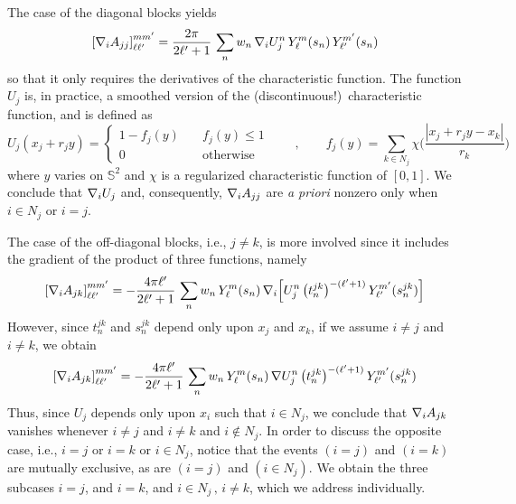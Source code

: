 The case of the diagonal blocks yields
\[
{[\nabla_i A_{jj}]}_{\ell \ell'}^{mm'} = \frac{2\pi}{2 \ell' + 1} \,\sum_{n} w_n \, \nabla_i U_j^n  \,Y_\ell^m(s_n) \,  Y_{\ell'}^{m'}(s_n)
\]
so that it only requires the derivatives of the characteristic function. The function $U_j$ is, in practice, a smoothed version of the (discontinuous!)~characteristic function, and is defined as 
\[
U_j(x_j + r_j y) =
\begin{cases}
1 - f_j(y) 	&\quad f_j(y) \le 1\\
0		&\quad \text{otherwise}
\end{cases}
\qquad , \qquad 
f_j(y) = \sum_{k \in N_j} \chi \bigg(\frac{|x_j + r_j y - x_k|}{r_k}\bigg)
\]
where $y$ varies on $\mathbb{S}^2$ and $\chi$ is a regularized characteristic function of $[0,1]$. We conclude that $\nabla_i U_j$ and, consequently, $\nabla_i A_{jj}$ are \emph{a priori} nonzero only when $i \in N_j$ or $i = j$.

The case of the off-diagonal blocks, i.e., $j \not=k$, is more involved since it includes the gradient of the product of three functions, namely
\begin{equation}\label{eq:7}
{[\nabla_iA_{jk}]}_{\ell \ell'}^{mm'} = -  \frac{4 \pi \ell'}{2 \ell'+1} \, \sum_{n} w_n\, Y_\ell^m(s_n) \,\nabla_i \Big[ U_j^n  \,  \big( t_n^{jk}\big)^{-(\ell'+1)} \, Y_{\ell'}^{m'} (s_n^{jk}) \Big]
\end{equation}
However, since $t_n^{jk}$ and $s_n^{jk}$ depend only upon $x_j$ and $x_k$, if we assume $i \not=j$ and $i\not=k$, we obtain
\begin{equation}\label{eq:8}
{[\nabla_iA_{jk}]}_{\ell \ell'}^{mm'} = -  \frac{4 \pi \ell'}{2 \ell'+1} \, \sum_{n} w_n\, Y_\ell^m(s_n) \,\nabla U_j^n  \,  \big( t_n^{jk}\big)^{-(\ell'+1)} \, Y_{\ell'}^{m'} (s_n^{jk})
\end{equation}
Thus, since $U_j$ depends only upon $x_i$ such that $i \in N_j$, we conclude that $\nabla_i A_{jk}$ vanishes whenever $i \not= j$ and $i \not=k$ and $i \not\in N_j$. In order to discuss the opposite case, i.e., $i = j$ or $i =k$ or $i \in N_j$, notice that the events $(i = j)$ and $(i = k)$ are mutually exclusive, as are $(i = j)$ and $(i \in N_j)$. We obtain the three subcases $i = j$, and $i = k$, and $i \in N_j \, , \, i \not= k$, which we address individually.

